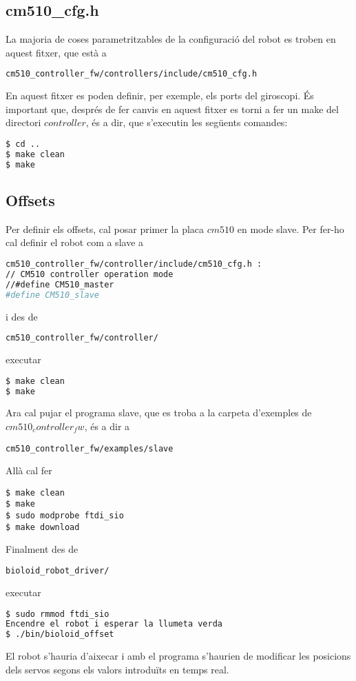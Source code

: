 \documentclass{article}
\begin{document}
\subsection{cm510\_cfg.h}
La majoria de coses parametritzables de la configuració del robot es troben en aquest fitxer, que està a 
\begin{lstlisting}[language=bash]
cm510_controller_fw/controllers/include/cm510_cfg.h
\end{lstlisting}
En aquest fitxer es poden definir, per exemple, els ports del giroscopi.
És important que, després de fer canvis en aquest fitxer es torni a fer un make del directori $controller$, és a dir, que s'executin les següents comandes:
\begin{lstlisting}[language=bash]
$ cd ..
$ make clean
$ make
\end{lstlisting}
\subsection{Offsets}
Per definir els offsets, cal posar primer la placa $cm510$ en mode slave. Per fer-ho cal definir el robot com a slave a 
\begin{lstlisting}[language=bash]
cm510_controller_fw/controller/include/cm510_cfg.h :
// CM510 controller operation mode
//#define CM510_master
#define CM510_slave
\end{lstlisting}
i des de 
\begin{lstlisting}[language=bash]
cm510_controller_fw/controller/
\end{lstlisting}
executar
\begin{lstlisting}[language=bash]
$ make clean
$ make
\end{lstlisting}
Ara cal pujar el programa slave, que es troba a la carpeta d'exemples de $cm510_controller_fw$, és a dir a
\begin{lstlisting}
cm510_controller_fw/examples/slave
\end{lstlisting}
Allà cal fer
\begin{lstlisting}
$ make clean
$ make
$ sudo modprobe ftdi_sio
$ make download
\end{lstlisting}

Finalment des de 
\begin{lstlisting}[language=bash]
bioloid_robot_driver/
\end{lstlisting}
executar
\begin{lstlisting}[language=bash]
$ sudo rmmod ftdi_sio
Encendre el robot i esperar la llumeta verda
$ ./bin/bioloid_offset
\end{lstlisting}
El robot s'hauria d'aixecar i amb el programa s'haurien de modificar les posicions dels servos segons els valors introduïts en temps real.
\end{document}
